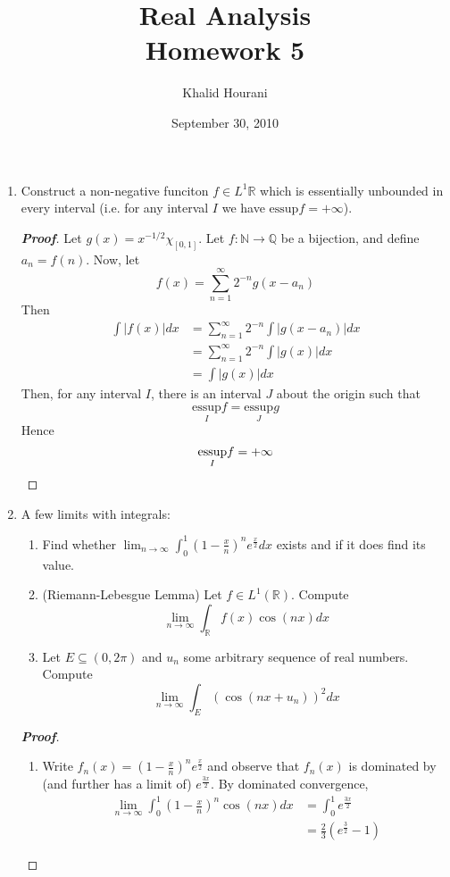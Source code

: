\documentclass[12pt,leqno]{book}
\title{Real Analysis\\\large Homework 5}
\date{September 30, 2010}
\author{Khalid Hourani}
\theoremstyle{definition}
\newcommand{\Q}{\mathbb{Q}}
\newcommand{\N}{\mathbb{N}}
\newcommand{\R}{\mathbb{R}}
\newenvironment{Proof}{\begin{proof}[\textnormal{\textbf{Proof}}]}{\end{proof}}
\begin{document}
\begin{titlepage}
 \maketitle 
\end{titlepage}

\begin{enumerate}
 \item Construct a non-negative funciton $f\in L^1{\R}$ which is essentially unbounded in every interval (i.e. for any interval $I$ we have $\text{essup}f=+\infty$).

\begin{Proof}
 Let $g(x)=x^{-1/2}\chi_{[0,1]}$. Let $f:\N\to\Q$ be a bijection, and define $a_n=f(n)$. Now, let \[f(x)=\sum_{n=1}^{\infty}2^{-n}g(x-a_n)\] Then \begin{align*}\int|f(x)|dx&=\sum_{n=1}^{\infty}2^{-n}\int|g(x-a_n)|dx\\&=\sum_{n=1}^{\infty}2^{-n}\int|g(x)|dx\\&=\int|g(x)|dx\end{align*} Then, for any interval $I$, there is an interval $J$ about the origin such that \[\underset{I}{\text{essup}}f=\underset{J}{\text{essup}}g\] Hence \[\underset{I}{\text{essup}}f=+\infty\qedhere\]
\end{Proof}

 \item A few limits with integrals:
  \begin{enumerate}
   \item Find whether $\lim_{n\to\infty}\int_0^1(1-\frac{x}{n})^ne^{\frac{x}{2}}dx$ exists and if it does find its value.
   \item (Riemann-Lebesgue Lemma) Let $f\in L^1(\R)$. Compute \[\lim_{n\to\infty}\int_{\R}f(x)\cos(nx)dx\]
   \item Let $E\subseteq(0,2\pi)$ and $u_n$ some arbitrary sequence of real numbers. Compute \[\lim_{n\to\infty}\int_E(\cos(nx+u_n))^2dx\]
  \end{enumerate}

\begin{Proof}\indent
 \begin{enumerate}
  \item Write $f_n(x)=(1-\frac{x}{n})^ne^{\frac{x}{2}}$ and observe that $f_n(x)$ is dominated by (and further has a limit of) $e^{\frac{3x}{2}}$. By dominated convergence, \begin{align*}\lim_{n\to\infty}\int_0^1\left(1-\frac{x}{n}\right)^n\cos(nx)dx&=\int_0^1e^{\frac{3x}{2}}\\&=\frac{2}{3}\left(e^{\frac{3}{2}}-1\right)\end{align*}


\end{enumerate}
\end{Proof}
\end{enumerate}
\end{document}
